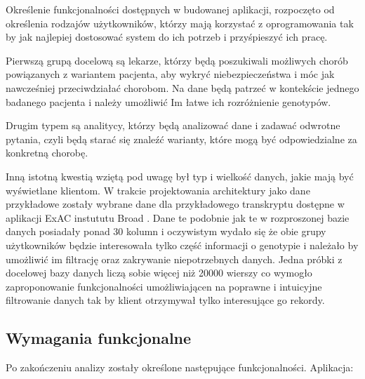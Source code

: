 \documentclass[a4paper,12pt,twoside]{article}
\begin{document}
Określenie funkcjonalności dostępnych w budowanej aplikacji, rozpoczęto od określenia 
rodzajów użytkowników, którzy mają korzystać z oprogramowania tak by jak najlepiej dostosować system do ich potrzeb i przyśpieszyć ich pracę.

Pierwszą grupą docelową są lekarze, którzy będą poszukiwali
możliwych chorób powiązanych z wariantem pacjenta, aby wykryć niebezpieczeństwa
i móc jak nawcześniej przeciwdziałać chorobom. 
Na dane będą patrzeć w kontekście jednego badanego pacjenta i należy umożliwić Im łatwe 
ich rozróżnienie genotypów. 

Drugim typem są analitycy, którzy będą analizować dane i zadawać 
odwrotne pytania, czyli będą starać się znaleźć warianty, które mogą być odpowiedzialne
za konkretną chorobę. 

Inną istotną kwestią wziętą pod uwagę był typ i wielkość danych, jakie mają być wyświetlane klientom.
W trakcie projektowania architektury jako dane przykładowe zostały wybrane dane dla przykładowego transkryptu dostępne w aplikacji ExAC instututu Broad \cite{exac} \cite{exacCite}. Dane te 
podobnie jak te w rozproszonej bazie danych posiadały ponad 30 kolumn i oczywistym wydało się że obie grupy użytkowników będzie interesowała tylko część informacji o genotypie i należało by umożliwić im filtrację oraz zakrywanie niepotrzebnych danych. 
Jedna próbki z docelowej bazy danych liczą sobie więcej niż 20000 wierszy co wymogło zaproponowanie 
funkcjonalności umożliwiającen na poprawne i intuicyjne filtrowanie danych 
tak by klient otrzymywał tylko interesujące go rekordy.

\newpage
\subsection{Wymagania funkcjonalne}
Po zakończeniu analizy zostały określone następujące funkcjonalności. Aplikacja:
\end{document}
